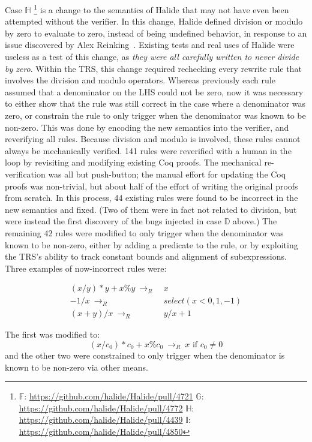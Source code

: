 \documentclass[acmsmall,review]{acmart}\settopmatter{printfolios=true,printccs=false,printacmref=false}
\newcommand{\rewrites}[0]{\:\rightarrow_{R}\:}
\newcommand{\pred}[0]{\textrm{ if }}
\begin{document}
Case $\mathbb{H}$
\footnote{
\label{footnote:casesfi}
$\mathbb{F}$: \url{https://github.com/halide/Halide/pull/4721}
$\mathbb{G}$: \url{https://github.com/halide/Halide/pull/4772}
$\mathbb{H}$: \url{https://github.com/halide/Halide/pull/4439}
$\mathbb{I}$: \url{https://github.com/halide/Halide/pull/4850}
}
is a change to the semantics of Halide that may not have even been attempted without the verifier. In this change, Halide defined division or modulo by zero to evaluate to zero, instead of being undefined behavior, in response to an issue discovered by Alex Reinking~\cite{reinkingthesis}. Existing tests and real uses of Halide were useless as a test of this change, as \emph{they were all carefully written to never divide by zero}. Within the TRS, this change required rechecking every rewrite rule that involves the division and modulo operators. Whereas previously each rule assumed that a denominator on the LHS could not be zero, now it was necessary to either show that the rule was still correct in the case where a denominator was zero, or constrain the rule to only trigger when the denominator was known to be non-zero. This was done by encoding the new semantics into the verifier, and reverifying all rules. Because division and modulo is involved, these rules cannot always be mechanically verified. 141 rules were reverified with a human in the loop by revisiting and modifying existing Coq proofs. The mechanical re-verification was all but push-button; the manual effort for updating the Coq proofs was non-trivial, but about half of the effort of writing the original proofs from scratch. In this process, 44 existing rules were found to be incorrect in the new semantics and fixed. (Two of them were in fact not related to division, but were instead the first discovery of the bugs injected in case $\mathbb{D}$ above.) The remaining 42 rules were modified to only trigger when the denominator was known to be non-zero, either by adding a predicate to the rule, or by exploiting the TRS’s ability to track constant bounds and alignment of subexpressions. Three examples of now-incorrect rules were:

\begin{align*}
(x/y)*y + x\%y \rewrites & x \\
  -1 / x \rewrites & select(x < 0, 1, -1) \\
(x + y)/x \rewrites & y/x + 1
\end{align*}

The first was modified to:
\[
(x/c_0)*c_0 + x\%c_0 \rewrites x \pred c_0 \neq 0
\]
and the other two were constrained to only trigger when the denominator is known to be non-zero via other means.
\end{document}
